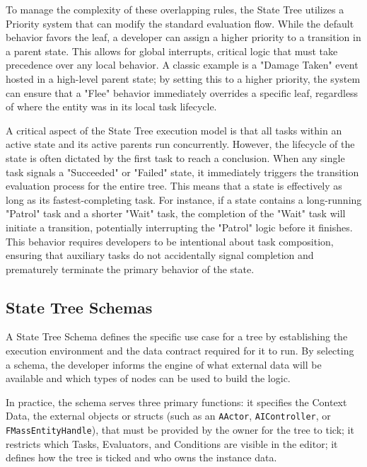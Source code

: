 To manage the complexity of these overlapping rules, the State Tree utilizes a Priority system that can modify the standard evaluation flow. While the default behavior favors the leaf, a developer can assign a higher priority to a transition in a parent state. This allows for global interrupts, critical logic that must take precedence over any local behavior. A classic example is a "Damage Taken" event hosted in a high-level parent state; by setting this to a higher priority, the system can ensure that a "Flee" behavior immediately overrides a specific leaf, regardless of where the entity was in its local task lifecycle.

A critical aspect of the State Tree execution model is that all tasks within an active state and its active parents run concurrently. However, the lifecycle of the state is often dictated by the first task to reach a conclusion. When any single task signals a "Succeeded" or "Failed" state, it immediately triggers the transition evaluation process for the entire tree. This means that a state is effectively as long as its fastest-completing task. For instance, if a state contains a long-running "Patrol" task and a shorter "Wait" task, the completion of the "Wait" task will initiate a transition, potentially interrupting the "Patrol" logic before it finishes. This behavior requires developers to be intentional about task composition, ensuring that auxiliary tasks do not accidentally signal completion and prematurely terminate the primary behavior of the state.

\subsection{State Tree Schemas}

A State Tree Schema defines the specific use case for a tree by establishing the execution environment and the data contract required for it to run. By selecting a schema, the developer informs the engine of what external data will be available and which types of nodes can be used to build the logic.

In practice, the schema serves three primary functions: it specifies the Context Data, the external objects or structs (such as an \texttt{AActor}, \texttt{AIController}, or \texttt{FMassEntityHandle}), that must be provided by the owner for the tree to tick; it restricts which Tasks, Evaluators, and Conditions are visible in the editor; it defines how the tree is ticked and who owns the instance data.

